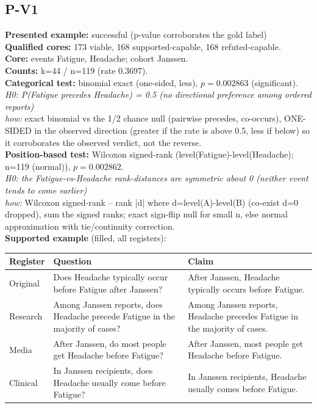 \documentclass[11pt]{article}
\begin{document}
\subsection*{P-V1}
\textbf{Presented example:} successful (p-value corroborates the gold label) \\
\textbf{Qualified cores:} 173 viable, 168 supported-capable, 168 refuted-capable. \\
\textbf{Core:} events Fatigue, Headache; cohort Janssen. \\
\textbf{Counts:} k=44 / n=119  (rate 0.3697). \\
\textbf{Categorical test:} binomial exact (one-sided, less), $p = 0.002863$ (significant). \\
\emph{H0: P(Fatigue precedes Headache) = 0.5 (no directional preference among ordered reports)} \\
\emph{how:} exact binomial vs the 1/2 chance null (pairwise precedes, co-occurs), ONE-SIDED in the observed direction (greater if the rate is above 0.5, less if below) so it corroborates the observed verdict, not the reverse. \\
\textbf{Position-based test:} Wilcoxon signed-rank (level(Fatigue)-level(Headache); n=119 (normal)), $p = 0.002862$. \\
\emph{H0: the Fatigue-vs-Headache rank-distances are symmetric about 0 (neither event tends to come earlier)} \\
\emph{how:} Wilcoxon signed-rank -- rank |d| where d=level(A)-level(B) (co-exist d=0 dropped), sum the signed ranks; exact sign-flip null for small n, else normal approximation with tie/continuity correction. \\
\textbf{Supported example} (filled, all registers): \\
\begin{tabularx}{\linewidth}{@{}l L L@{}}
\toprule
\textbf{Register} & \textbf{Question} & \textbf{Claim} \\
\midrule
Original & Does Headache typically occur before Fatigue after Janssen? & After Janssen, Headache typically occurs before Fatigue. \\
Research & Among Janssen reports, does Headache precede Fatigue in the majority of cases? & Among Janssen reports, Headache precedes Fatigue in the majority of cases. \\
Media & After Janssen, do most people get Headache before Fatigue? & After Janssen, most people get Headache before Fatigue. \\
Clinical & In Janssen recipients, does Headache usually come before Fatigue? & In Janssen recipients, Headache usually comes before Fatigue. \\
\bottomrule
\end{tabularx}
\end{document}
